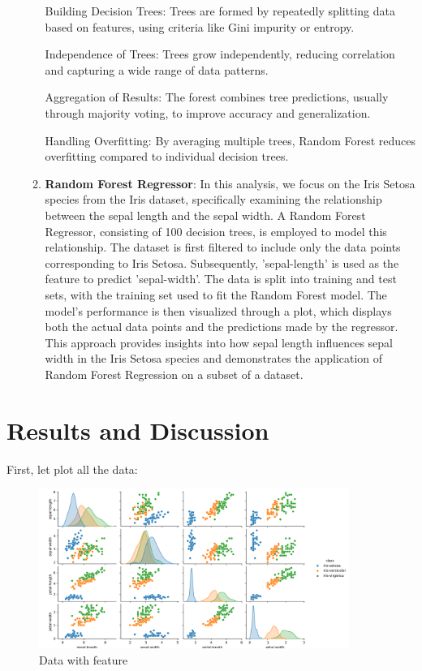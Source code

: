 \documentclass[a4paper]{article}
\begin{document}
\begin{enumerate}
\begin{enumerate}
		Building Decision Trees: Trees are formed by repeatedly splitting data based on features, using criteria like Gini impurity or entropy.
		
		Independence of Trees: Trees grow independently, reducing correlation and capturing a wide range of data patterns.
		
		Aggregation of Results: The forest combines tree predictions, usually through majority voting, to improve accuracy and generalization.
		
		Handling Overfitting: By averaging multiple trees, Random Forest reduces overfitting compared to individual decision trees.
\item \textbf{Random Forest Regressor}:
In this analysis, we focus on the Iris Setosa species from the Iris dataset, specifically examining the relationship between the sepal length and the sepal width. A Random Forest Regressor, consisting of 100 decision trees, is employed to model this relationship. The dataset is first filtered to include only the data points corresponding to Iris Setosa. Subsequently, 'sepal-length' is used as the feature to predict 'sepal-width'. The data is split into training and test sets, with the training set used to fit the Random Forest model. The model's performance is then visualized through a plot, which displays both the actual data points and the predictions made by the regressor. This approach provides insights into how sepal length influences sepal width in the Iris Setosa species and demonstrates the application of Random Forest Regression on a subset of a dataset.		
	\end{enumerate}


\end{enumerate}

\section{Results and Discussion}
First, let plot all the data:
\begin{figure}[h]
	\centering
	\includegraphics[width=0.9\textwidth]{picture/data}
	\caption{Data with feature}
	\label{fig:example}
\end{figure}
\end{document}
